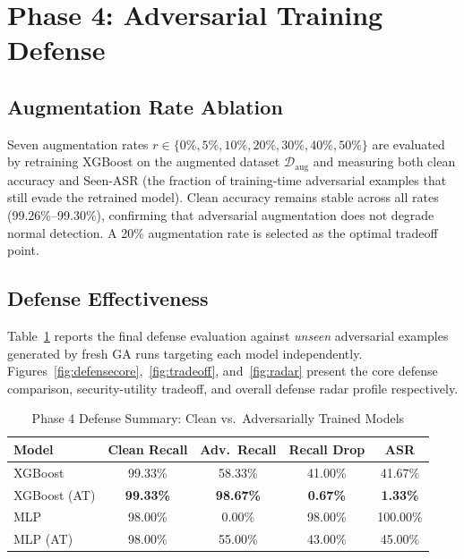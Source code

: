 \documentclass[review,12pt]{elsarticle}
\begin{document}
\section{Phase 4: Adversarial Training Defense}
\label{sec:phase4}

\subsection{Augmentation Rate Ablation}

Seven augmentation rates $r \in \{0\%, 5\%, 10\%, 20\%, 30\%, 40\%, 50\%\}$ are evaluated by retraining XGBoost on the augmented dataset $\mathcal{D}_\text{aug}$ and measuring both clean accuracy and Seen-ASR (the fraction of training-time adversarial examples that still evade the retrained model). Clean accuracy remains stable across all rates (99.26\%--99.30\%), confirming that adversarial augmentation does not degrade normal detection. A 20\% augmentation rate is selected as the optimal tradeoff point.

\subsection{Defense Effectiveness}

Table~\ref{tab:defense} reports the final defense evaluation against \emph{unseen} adversarial examples generated by fresh GA runs targeting each model independently. Figures~\ref{fig:defensecore},~\ref{fig:tradeoff}, and~\ref{fig:radar} present the core defense comparison, security-utility tradeoff, and overall defense radar profile respectively.

\begin{table}[htbp]
\centering
\caption{Phase 4 Defense Summary: Clean vs.\ Adversarially Trained Models}
\label{tab:defense}
\begin{tabular}{lcccc}
\toprule
\textbf{Model} & \textbf{Clean Recall} & \textbf{Adv.\ Recall} & \textbf{Recall Drop} & \textbf{ASR} \\
\midrule
XGBoost        & 99.33\% & 58.33\%  & 41.00\% & 41.67\% \\
XGBoost (AT)   & \textbf{99.33\%} & \textbf{98.67\%} & \textbf{0.67\%} & \textbf{1.33\%} \\
\midrule
MLP            & 98.00\% & 0.00\%   & 98.00\% & 100.00\% \\
MLP (AT)       & 98.00\% & 55.00\%  & 43.00\% & 45.00\%  \\
\bottomrule
\end{tabular}
\end{table}
\end{document}
